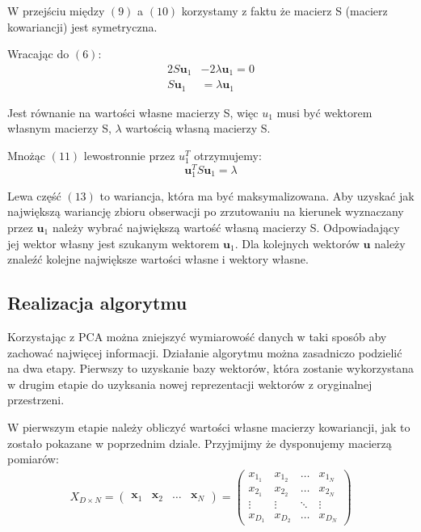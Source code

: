\documentclass[oneside, eng]{mgr}
\newcommand{\bb}{\textbf}
\begin{document}
W przejściu między $(9)$ a $(10)$ korzystamy z faktu że macierz S (macierz kowariancji) jest symetryczna.

Wracając do $(6)$:
\begin{align}
	2 S \bb{u}_1 &- 2 \lambda \bb{u}_1 = 0	\nonumber \\
	S \bb{u}_1 &= \lambda \bb{u}_1 
\end{align}

Jest równanie na wartości własne macierzy S, więc $u_1$ musi być wektorem własnym macierzy S, $\lambda$ wartością własną macierzy S.

Mnożąc $(11)$ lewostronnie przez $u_1^T$ otrzymujemy:
\begin{equation}
	\bb{u}_1^T S \bb{u}_1 = \lambda
\end{equation}

Lewa część $(13)$ to wariancja, która ma być maksymalizowana. Aby uzyskać jak największą wariancję zbioru obserwacji po zrzutowaniu na kierunek wyznaczany przez $\bb{u}_1$ należy wybrać największą wartość własną macierzy S. Odpowiadający jej wektor własny jest szukanym wektorem $\bb{u}_1$. Dla kolejnych wektorów $\bb{u}$ należy znaleźć kolejne największe wartości własne i wektory własne.

\subsection{Realizacja algorytmu} 
Korzystając z PCA można zniejszyć wymiarowość danych w taki sposób aby zachować najwięcej informacji. Działanie algorytmu można zasadniczo podzielić na dwa etapy. Pierwszy to uzyskanie bazy wektorów, która zostanie wykorzystana w drugim etapie do uzyksania nowej reprezentacji wektorów z oryginalnej przestrzeni.

W pierwszym etapie należy obliczyć wartości własne macierzy kowariancji, jak to zostało pokazane w poprzednim dziale. Przyjmijmy że dysponujemy macierzą pomiarów:
\begin{align}
	X_{D \times N} = 
	\left( \begin{array}{llll}
		\bb{x}_1 & \bb{x}_2 & \ldots & \bb{x}_N
	\end{array} \right)	
	=
	\left( \begin{array}{llll}
		x_{1_1} & x_{1_2} & \ldots & x_{1_N} \\
		x_{2_1} & x_{2_2} & \ldots & x_{2_N} \\
		\vdots  & \vdots  & \ddots & \vdots  \\
		x_{D_1} & x_{D_2} & \ldots & x_{D_N}
	\end{array} \right)
\end{align}
\end{document}
